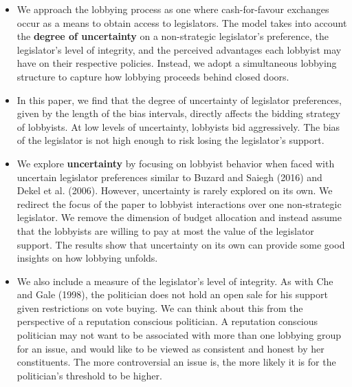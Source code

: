 \documentclass[a4paper,12pt]{article}
\begin{document}
\begin{enumerate}
\begin{itemize}
\item We approach the lobbying process as one where cash-for-favour exchanges occur as a means to obtain access to legislators. The model takes into account the \textbf{degree of uncertainty} on a non-strategic legislator’s preference, the legislator’s level of integrity, and the perceived advantages each lobbyist may have on their respective policies. Instead, we adopt a simultaneous lobbying structure to capture how lobbying proceeds behind closed doors.
\item In this paper, we find that the degree of uncertainty of legislator preferences, given by the length of the bias intervals, directly affects the bidding strategy of lobbyists. At low levels of uncertainty, lobbyists bid aggressively. The bias of the legislator is not high enough to risk losing the legislator’s support. 
\item We explore \textbf{uncertainty} by focusing on lobbyist behavior when faced with uncertain legislator preferences similar to Buzard and Saiegh (2016) and Dekel et al. (2006).  However, uncertainty is rarely explored on its own. We redirect the focus of the paper to lobbyist interactions over one non-strategic legislator. We remove the dimension of budget allocation and instead assume that the lobbyists are willing to pay at most the value of the legislator support. The results show that uncertainty on its own can provide some good insights on how lobbying unfolds. 
\item We also include a measure of the legislator’s level of integrity. As with Che and Gale (1998), the politician does not hold an open sale for his support given restrictions on vote buying. We can think about this from the perspective of a reputation conscious politician. A reputation conscious politician may not want to be associated with more than one lobbying group for an issue, and would like to be viewed as consistent and honest by her constituents. The more controversial an issue is, the more likely it is for the politician’s threshold to be higher. 

\end{itemize}

\newpage





\end{enumerate}
\end{document}
